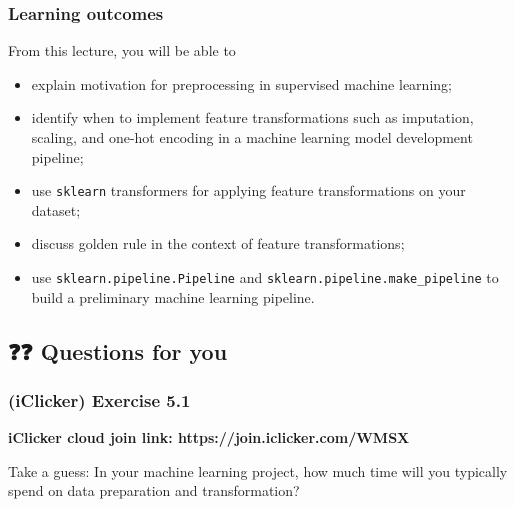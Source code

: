 \documentclass[11pt]{article}
\providecommand{\tightlist}{%
      \setlength{\itemsep}{0pt}\setlength{\parskip}{0pt}}
\begin{document}
    \subsubsection{Learning outcomes}\label{learning-outcomes}

From this lecture, you will be able to

\begin{itemize}
\tightlist
\item
  explain motivation for preprocessing in supervised machine learning;
\item
  identify when to implement feature transformations such as imputation,
  scaling, and one-hot encoding in a machine learning model development
  pipeline;
\item
  use \texttt{sklearn} transformers for applying feature transformations
  on your dataset;
\item
  discuss golden rule in the context of feature transformations;
\item
  use \texttt{sklearn.pipeline.Pipeline} and
  \texttt{sklearn.pipeline.make\_pipeline} to build a preliminary
  machine learning pipeline.
\end{itemize}

    

    \subsection{❓❓ Questions for you}\label{questions-for-you}

    \subsubsection{(iClicker) Exercise 5.1}\label{iclicker-exercise-5.1}

\textbf{iClicker cloud join link: https://join.iclicker.com/WMSX}

Take a guess: In your machine learning project, how much time will you
typically spend on data preparation and transformation?
\end{document}
